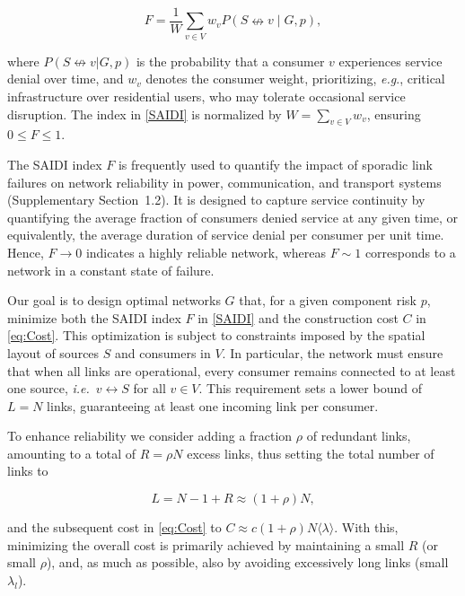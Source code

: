 \documentclass[oneside, a4paper, onecolumn, 11pt]{article}
\newcommand{\av}[1]{\langle #1 \rangle}
\begin{document}
\begin{refsection}
\begin{equation}
F = \frac{1}{W}\sum_{v \in V} w_v P(S \nleftrightarrow v \mid G,p),
\label{SAIDI}
\end{equation}

where $P(S \nleftrightarrow v | G,p)$ is the probability that a consumer $v$ experiences service denial over time, and $w_v$ denotes the consumer weight, prioritizing, \textit{e.g}., critical infrastructure over residential users, who may tolerate occasional service disruption. The index in \eqref{SAIDI} is normalized by $W = \sum_{v \in V} w_v$, ensuring $0 \le F \le 1$. 

The SAIDI index $F$ is frequently used to quantify the impact of sporadic link failures on network reliability in power, communication, and transport systems~\supercite{colbourn1987combinatorics,trifunovic2006water,perez2018sixty,bolch2006queueing,monte_carlo} (Supplementary Section~1.2). It is designed to capture service continuity by quantifying the average fraction of consumers denied service at any given time, or equivalently, the average duration of service denial per consumer per unit time. Hence, $F \to 0$ indicates a highly reliable network, whereas $F \sim 1$ corresponds to a network in a constant state of failure. 

Our goal is to design optimal networks $G$ that, for a given component risk $p$, minimize both the SAIDI index $F$ in \eqref{SAIDI} and the construction cost $C$ in \eqref{eq:Cost}. This optimization is subject to constraints imposed by the spatial layout of sources $S$ and consumers in $V$. In particular, the network must ensure that when all links are operational, every consumer remains connected to at least one source, \textit{i.e.}\ $v \leftrightarrow S$ for all $v \in V$. This requirement sets a lower bound of $L = N$ links, guaranteeing at least one incoming link per consumer. 

To enhance reliability we consider adding a fraction $\rho$ of redundant links, amounting to a total of $R = \rho N$ excess links, thus setting the total number of links to

\begin{equation}
L = N - 1 + R \approx (1 + \rho)N,
\label{LNR}
\end{equation}

and the subsequent cost in \eqref{eq:Cost} to $C \approx c (1 + \rho) N \av \lambda$. With this, minimizing the overall cost is primarily achieved by maintaining a small $R$ (or small $\rho$), and, as much as possible, also by avoiding excessively long links (small $\lambda_l$).  



\end{refsection}
\end{document}
